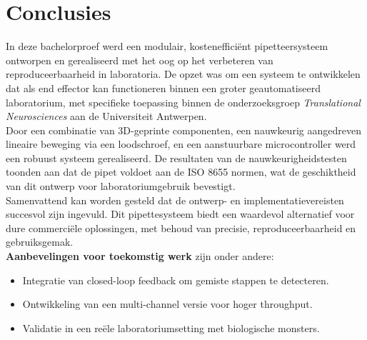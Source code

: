 \chapter{Conclusies}
In deze bachelorproef werd een modulair, kostenefficiënt pipetteersysteem ontworpen en gerealiseerd met het oog op het verbeteren van reproduceerbaarheid in laboratoria. De opzet was om een systeem te ontwikkelen dat als end effector kan functioneren binnen een groter geautomatiseerd laboratorium, met specifieke toepassing binnen de onderzoeksgroep \textit{Translational Neurosciences} aan de Universiteit Antwerpen.
\\[12pt]Door een combinatie van 3D-geprinte componenten, een nauwkeurig aangedreven lineaire beweging via een loodschroef, en een aanstuurbare microcontroller werd een robuust systeem gerealiseerd. De resultaten van de nauwkeurigheidstesten toonden aan dat de pipet voldoet aan de ISO 8655 normen, wat de geschiktheid van dit ontwerp voor laboratoriumgebruik bevestigt.
\\[12pt]Samenvattend kan worden gesteld dat de ontwerp- en implementatievereisten succesvol zijn ingevuld. Dit pipettesysteem biedt een waardevol alternatief voor dure commerciële oplossingen, met behoud van precisie, reproduceerbaarheid en gebruiksgemak.
\\[12pt]\textbf{Aanbevelingen voor toekomstig werk} zijn onder andere:
\begin{itemize}
  \item Integratie van closed-loop feedback om gemiste stappen te detecteren.
  \item Ontwikkeling van een multi-channel versie voor hoger throughput.
  \item Validatie in een reële laboratoriumsetting met biologische monsters.
\end{itemize}